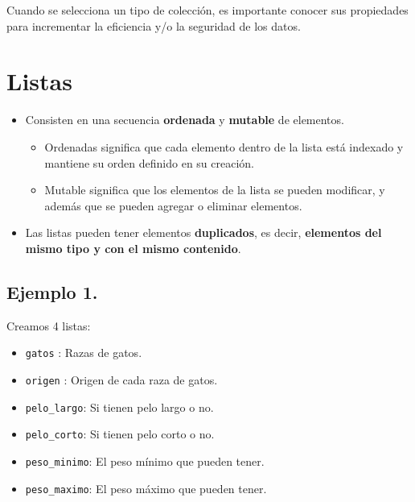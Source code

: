 \documentclass[
  letterpaper,
  DIV=11,
  numbers=noendperiod]{scrreprt}
\providecommand{\tightlist}{%
  \setlength{\itemsep}{0pt}\setlength{\parskip}{0pt}}\usepackage{longtable,booktabs,array}
\begin{document}
Cuando se selecciona un tipo de colección, es importante conocer sus
propiedades para incrementar la eficiencia y/o la seguridad de los
datos.


\chapter{Listas}\label{listas}

\begin{itemize}
\tightlist
\item
  Consisten en una secuencia \textbf{ordenada} y \textbf{mutable} de
  elementos.

  \begin{itemize}
  \tightlist
  \item
    Ordenadas significa que cada elemento dentro de la lista está
    indexado y mantiene su orden definido en su creación.
  \item
    Mutable significa que los elementos de la lista se pueden modificar,
    y además que se pueden agregar o eliminar elementos.
  \end{itemize}
\item
  Las listas pueden tener elementos \textbf{duplicados}, es decir,
  \textbf{elementos del mismo tipo y con el mismo contenido}.
\end{itemize}

\section{\texorpdfstring{\textbf{Ejemplo
1.}}{Ejemplo 1.}}\label{ejemplo-1.}

Creamos 4 listas:

\begin{itemize}
\tightlist
\item
  \texttt{gatos} : Razas de gatos.
\item
  \texttt{origen} : Origen de cada raza de gatos.
\item
  \texttt{pelo\_largo}: Si tienen pelo largo o no.
\item
  \texttt{pelo\_corto}: Si tienen pelo corto o no.
\item
  \texttt{peso\_minimo}: El peso mínimo que pueden tener.
\item
  \texttt{peso\_maximo}: El peso máximo que pueden tener.
\end{itemize}
\end{document}
